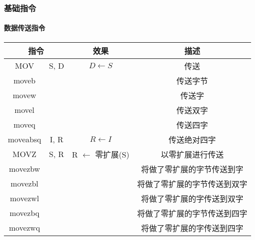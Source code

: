 \subsubsection{基础指令}
\paragraph{数据传送指令}
\begin{table}[H]
    \centering
    \begin{tabular}{|c c|c|c|}
        \hline
        \multicolumn{2}{|c|}{\textbf{指令}} & \textbf{效果} & \textbf{描述}                                       \\
        \hline
        MOV                               & S, D        & $D \leftarrow S$               & 传送               \\
        \hline
        moveb                             &             &                                & 传送字节             \\
        movew                             &             &                                & 传送字              \\
        movel                             &             &                                & 传送双字             \\
        moveq                             &             &                                & 传送四字             \\
        moveabsq                          & I, R        & $R \leftarrow I$               & 传送绝对四字           \\
        \hline
        MOVZ                              & S, R        & R $\leftarrow$ 零扩展(S)          & 以零扩展进行传送         \\
        \hline
        movezbw                           &             &                                & 将做了零扩展的字节传送到字    \\
        movezbl                           &             &                                & 将做了零扩展的字节传送到双字   \\
        movezwl                           &             &                                & 将做了零扩展的字传送到双字    \\
        movezbq                           &             &                                & 将做了零扩展的字节传送到四字   \\
        movezwq                           &             &                                & 将做了零扩展的字传送到四字    \\

\end{tabular}
\end{table}
